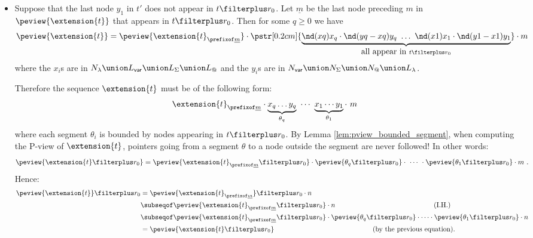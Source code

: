 \begin{itemize}
\begin{itemize}
        \item Suppose that the last node $y_1$ in $t'$ does not appear in $t\filterplus r_0$.
        Let $\underline{m}$ be the last node preceding $m$ in $\peview{\extension{t}}$ that appears in $t\filterplus r_0$. Then for some $q\geq 0$ we have
        \begin{equation*}
        \peview{\extension{t}} = \peview{\extension{t}_{\prefixof \underline{m}}} \cdot \pstr[0.2cm]{ \underbrace{\nd(xq){x_q} \cdot \nd(yq-xq){y_q}\ \ldots\ \nd(x1){x_1} \cdot \nd(y1-x1){y_1}}_{\mbox{all appear in } t\filterplus r_0}} \cdot m
        \end{equation*}
        where the $x_i$s are in $ N_\lambda \union L_{\sf var} \union  L_\Sigma \union L_@$ and the $y_i$s are in $N_{\sf var} \union N_\Sigma \union N_@ \union L_\lambda$.

        Therefore the sequence $\extension{t}$ must be of the following form:
        $$\extension{t}_{\prefixof \underline{m}} \cdot \underbrace{x_q \ldots y_q}_{\theta_q} \ \cdots \ \underbrace{x_1 \cdots y_1}_{\theta_1} \cdot\ m $$
        where each segment $\theta_i$ is bounded by nodes appearing in $t\filterplus r_0$.
        By Lemma \ref{lem:pview_bounded_segment}, when computing the P-view of $\extension{t}$, pointers going from a segment $\theta$ to a node outside the segment are never followed! In other words:
        $$ \peview{\extension{t} \filterplus r_0} =
        \peview{\extension{t}_{\prefixof \underline{m}} \filterplus r_0} \cdot \peview{\theta_q \filterplus r_0} \cdot\ \cdots\
        \cdot \peview{\theta_1 \filterplus r_0} \cdot m \ .$$
        Hence:
            \begin{align*}
            \peview{\extension{t}} \filterplus r_0
            &= \peview{\extension{t}_{\prefixof \underline{m}}} \filterplus r_0 \cdot n \\
            &\subseqof \peview{\extension{t}_{\prefixof \underline{m}} \filterplus r_0}  \cdot n
                    \hspace{5cm} \mbox{(I.H.)} \\
            &\subseqof \peview{\extension{t}_{\prefixof \underline{m}} \filterplus r_0} \cdot \peview{\theta_q \filterplus r_0} \cdot \cdots \cdot \peview{\theta_1 \filterplus r_0}  \cdot n \\
            &= \peview{\extension{t} \filterplus r_0} \hspace{5cm}
                    \mbox{(by the previous equation).}
          \end{align*}
    \end{itemize}


\end{itemize}
